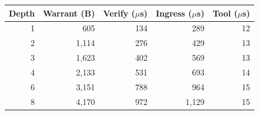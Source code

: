 \begin{tabular}{@{}rrrrr@{}}
\toprule
Depth & Warrant (B) & Verify ($\mu$s) & Ingress ($\mu$s) & Tool ($\mu$s) \\
\midrule
1 & 605 & 134 & 289 & 12 \\
2 & 1{,}114 & 276 & 429 & 13 \\
3 & 1{,}623 & 402 & 569 & 13 \\
4 & 2{,}133 & 531 & 693 & 14 \\
6 & 3{,}151 & 788 & 964 & 15 \\
8 & 4{,}170 & 972 & 1{,}129 & 15 \\
\bottomrule
\end{tabular}
